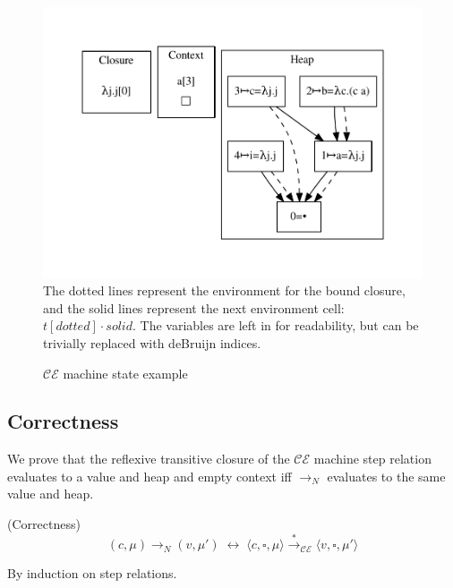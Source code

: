 \begin{figure}
\includegraphics[width=\linewidth]{figures/18.pdf}
The dotted lines represent the environment for the bound closure, and the solid
lines represent the next environment cell:  $t[dotted] \cdot solid$. The
variables are left in for readability, but can be trivially replaced with
deBruijn indices. 

\caption{$\mathcal{CE}$ machine state example}
\label{fig:state}
\end{figure}

\subsection{Correctness}
We prove that the reflexive transitive closure of the $\mathcal{CE}$ machine
step relation evaluates to a value and heap and empty context iff
$\xrightarrow{}_{N}$ evaluates to the same value and heap.

{\theorem \textnormal{(Correctness)} $$(c, \mu) \rightarrow_{N} (v, \mu') \;
\leftrightarrow \; \langle c, \square, \mu \rangle \xrightarrow{*
}_{\mathcal{CE}} \langle v, \square, \mu' \rangle $$} 

By induction on step relations.

